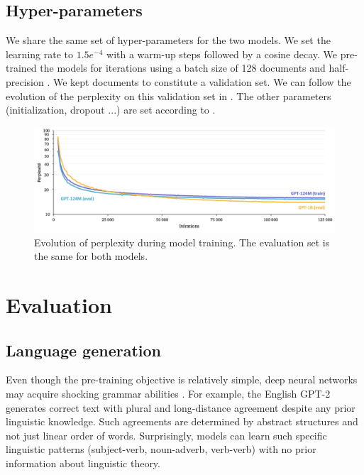 \subsection{Hyper-parameters}

We share the same set of hyper-parameters for the two models. We set the learning rate to $1.5e^{-4}$ with a  warm-up steps followed by a cosine decay. We pre-trained the models for  iterations using a batch size of 128 documents and half-precision \parencite{micikevicius_18}. We kept  documents to constitute a validation set. We can follow the evolution of the perplexity on this validation set in . The other parameters (initialization, dropout ...) are set according to \textcite{radford_2018}.

\begin{figure}[!htb]
\begin{center}
\includegraphics[width=16cm]{images/ppl-training-5.png}
\end{center}
\caption{Evolution of perplexity during model training. The evaluation set is the same for both models.}
\end{figure}

\section{Evaluation}

\subsection{Language generation}

 Even though the pre-training objective is relatively simple, deep neural networks may acquire shocking grammar abilities \parencite{linzen_2020}. For example, the English GPT-2 generates correct text with plural and long-distance agreement despite any prior linguistic knowledge. Such agreements are determined by abstract structures and not just linear order of words. Surprisingly, models can learn such specific linguistic patterns (subject-verb, noun-adverb, verb-verb) with no prior information about linguistic theory. 


